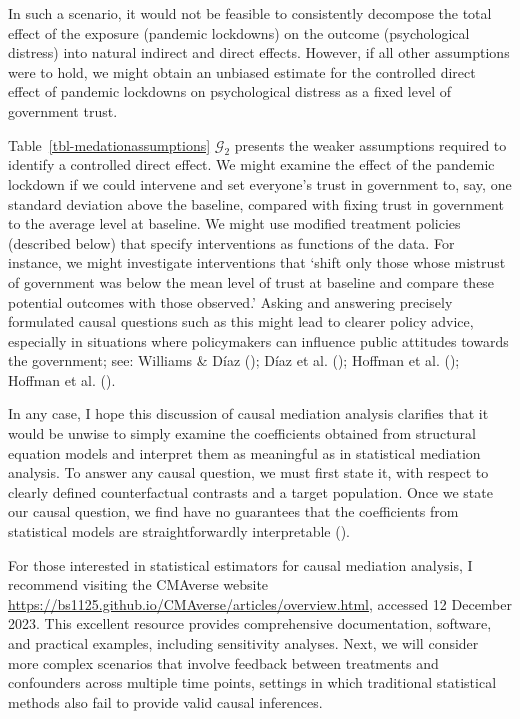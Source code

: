 \documentclass[
  single column]{article}
\begin{document}
In such a scenario, it would not be feasible to consistently decompose
the total effect of the exposure (pandemic lockdowns) on the outcome
(psychological distress) into natural indirect and direct effects.
However, if all other assumptions were to hold, we might obtain an
unbiased estimate for the controlled direct effect of pandemic lockdowns
on psychological distress as a fixed level of government trust.

Table~\ref{tbl-medationassumptions} \(\mathcal{G}_2\) presents the
weaker assumptions required to identify a controlled direct effect. We
might examine the effect of the pandemic lockdown if we could intervene
and set everyone's trust in government to, say, one standard deviation
above the baseline, compared with fixing trust in government to the
average level at baseline. We might use modified treatment policies
(described below) that specify interventions as functions of the data.
For instance, we might investigate interventions that `shift only those
whose mistrust of government was below the mean level of trust at
baseline and compare these potential outcomes with those observed.'
Asking and answering precisely formulated causal questions such as this
might lead to clearer policy advice, especially in situations where
policymakers can influence public attitudes towards the government; see:
Williams \& Díaz (); Díaz et al.
(); Hoffman et al.
(); Hoffman et al.
().

In any case, I hope this discussion of causal mediation analysis
clarifies that it would be unwise to simply examine the coefficients
obtained from structural equation models and interpret them as
meaningful as in statistical mediation analysis. To answer any causal
question, we must first state it, with respect to clearly defined
counterfactual contrasts and a target population. Once we state our
causal question, we find have no guarantees that the coefficients from
statistical models are straightforwardly interpretable
().

For those interested in statistical estimators for causal mediation
analysis, I recommend visiting the CMAverse website
\url{https://bs1125.github.io/CMAverse/articles/overview.html}, accessed
12 December 2023. This excellent resource provides comprehensive
documentation, software, and practical examples, including sensitivity
analyses. Next, we will consider more complex scenarios that involve
feedback between treatments and confounders across multiple time points,
settings in which traditional statistical methods also fail to provide
valid causal inferences.
\end{document}
